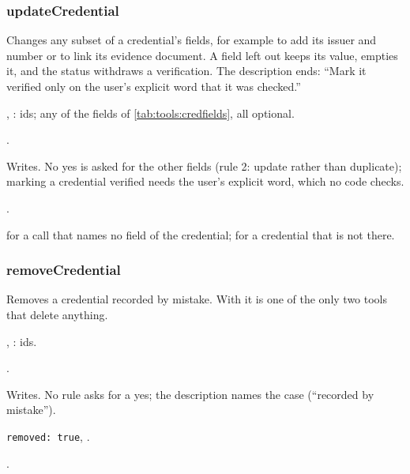 \subsubsection{updateCredential}\label{sec:tools:updateCredential}
\begin{description}[style=multiline, leftmargin=19mm, labelwidth=17mm, labelsep=2mm,
  font=\sffamily\bfseries\footnotesize\color{ink}, itemsep=1pt, topsep=2pt, before=\raggedright]
  \item[Does] Changes any subset of a credential's fields, for example to add its issuer and
    number or to link its evidence document. A field left out keeps its value, 
    empties it, and the status  withdraws a verification. The description ends:
    \enquote{Mark it verified only on the user's explicit word that it was checked.}
  \item[Input] , : ids; any of the fields of
    \cref{tab:tools:credfields}, all optional.
  \item[Calls] .
  \item[Kind] Writes. No yes is asked for the other fields (rule 2: update rather than
    duplicate); marking a credential verified needs the user's explicit word, which no code
    checks.
  \item[Returns] .
  \item[Errors]  for a call that names no field of the credential;
     for a credential that is not there.
\end{description}

\subsubsection{removeCredential}\label{sec:tools:removeCredential}
\begin{description}[style=multiline, leftmargin=19mm, labelwidth=17mm, labelsep=2mm,
  font=\sffamily\bfseries\footnotesize\color{ink}, itemsep=1pt, topsep=2pt, before=\raggedright]
  \item[Does] Removes a credential recorded by mistake. With  it is
    one of the only two tools that delete anything.
  \item[Input] , : ids.
  \item[Calls] .
  \item[Kind] Writes. No rule asks for a yes; the description names the case (\enquote{recorded
    by mistake}).
  \item[Returns] \texttt{removed: true}, .
  \item[Errors] .
\end{description}

